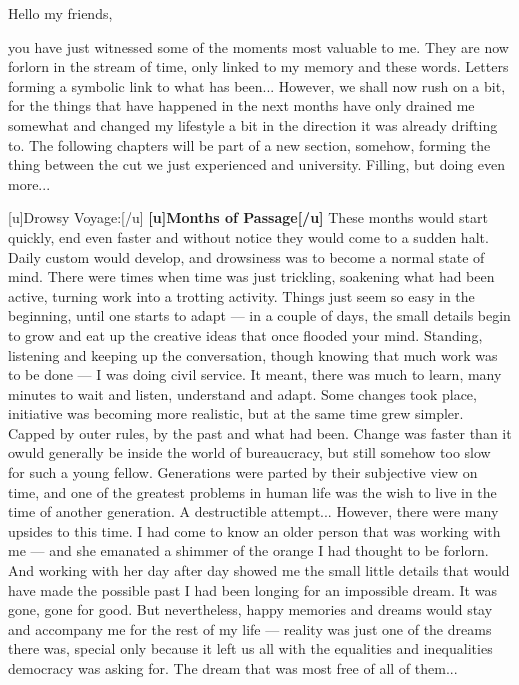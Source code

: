Hello my friends, 

you have just witnessed some of the moments most valuable to me. They are now forlorn in the stream of time, only linked to my memory and these words. Letters forming a symbolic link to what has been... 
However, we shall now rush on a bit, for the things that have happened in the next months have only drained me somewhat and changed my lifestyle a bit in the direction it was already drifting to. The following chapters will be part of a new section, somehow, forming the thing between the cut we just experienced and university. Filling, but doing even more... 

[u]Drowsy Voyage:[/u]
\textbf{[u]Months of Passage[/u]}
These months would start quickly, end even faster and without notice they would come to a sudden halt. Daily custom would develop, and drowsiness was to become a normal state of mind. 
There were times when time was just trickling, soakening what had been active, turning work into a trotting activity. Things just seem so easy in the beginning, until one starts to adapt --- in a couple of days, the small details begin to grow and eat up the creative ideas that once flooded your mind. 
Standing, listening and keeping up the conversation, though knowing that much work was to be done --- I was doing civil service. It meant, there was much to learn, many minutes to wait and listen, understand and adapt. Some changes took place, initiative was becoming more realistic, but at the same time grew simpler. Capped by outer rules, by the past and what had been. Change was faster than it owuld generally be inside the world of bureaucracy, but still somehow too slow for such a young fellow. Generations were parted by their subjective view on time, and one of the greatest problems in human life was the wish to live in the time of another generation. A destructible attempt... 
However, there were many upsides to this time. I had come to know an older person that was working with me --- and she emanated a shimmer of the orange I had thought to be forlorn. And working with her day after day showed me the small little details that would have made the possible past I had been longing for an impossible dream. 
It was gone, gone for good. But nevertheless, happy memories and dreams would stay and accompany me for the rest of my life --- reality was just one of the dreams there was, special only because it left us all with the equalities and inequalities democracy was asking for. The dream that was most free of all of them... 
